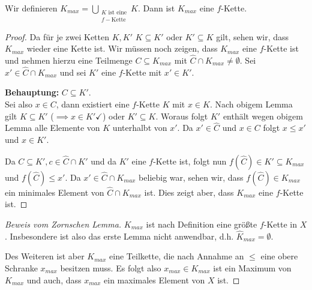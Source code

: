 \begin{lemma}[Vereinigung]
Wir definieren $K_{max} = \bigcup_{\substack{K \text{ ist eine} \\f-\text{Kette}}} K$.
	Dann ist $K_{max}$ eine $f$-Kette.
\end{lemma}

\begin{proof}
	Da für je zwei Ketten $K,K'$ $K \subseteq K'$ oder $K' \subseteq K$ gilt, sehen wir, dass $K_{max}$ wieder eine Kette ist.
	Wir müssen noch zeigen, dass $K_{max}$ eine $f$-Kette ist und nehmen hierzu eine Teilmenge $C \subseteq K_{max}$
	mit  $\widehat{C} \cap K_{max} \neq \emptyset$.
	Sei $x' \in \widehat{C} \cap K_{max}$ und sei $K'$ eine $f$-Kette mit $x' \in K'$.

	\textbf{Behauptung:} $C \subseteq K'$.\\
	Sei also $x \in C$, dann existiert eine $f$-Kette $K$ mit $x \in K$.
	Nach obigem Lemma gilt $K \subseteq K'$ ($\implies x \in K' \checkmark$) oder $K' \subseteq K$. 
	Woraus folgt $K'$ enthält wegen obigem Lemma alle Elemente von $K$ unterhalbt von $x'$.
	Da $x' \in \widehat{C}$ und $x \in C$ folgt $x \leq x'$ und $x \in K'.$

	Da $C \subseteq K', c \in \widehat{C} \cap K'$ und da $K'$ eine $f$-Kette ist, folgt nun $f(\widehat{C}) \in K' \subseteq K_{max}$ und $f(\widehat{C}) \leq x'$.
	Da $x' \in \widehat{C} \cap K_{max}$ beliebig war, sehen wir, dass $f(\widehat{C}) \in K_{max}$ ein minimales Element von $\widehat{C} \cap K_{max}$ ist.
	Dies zeigt aber, dass $K_{max}$ eine $f$-Kette ist.
\end{proof}

\begin{proof}[Beweis vom Zornschen Lemma]
	$K_{max}$ ist nach Definition eine größte $f$-Kette in $X$.
	Insbesondere ist also das erste Lemma nicht anwendbar, d.h. $\widehat{K}_{max} = \emptyset$.

	Des Weiteren ist aber $K_{max}$ eine Teilkette, die nach Annahme an $\leq$ eine obere Schranke $x_{max}$ besitzen muss.
	Es folgt also $x_{max} \in K_{max}$ ist ein Maximum von $K_{max}$ und auch, dass $x_{max}$ ein maximales Element von $X$ ist.
\end{proof}



























